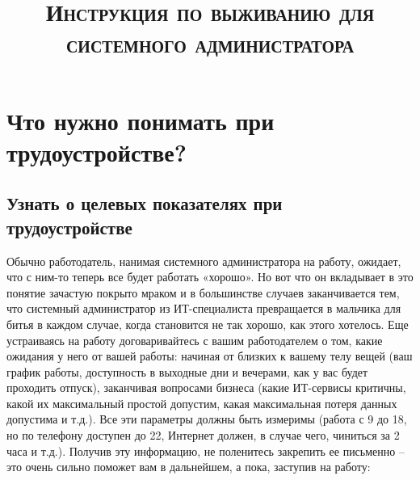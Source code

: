 

\setmainfont{Times New Roman}

\title{\textbf{\textsc{Инструкция по выживанию для системного администратора}}}
\author{}
\date{} %
\linespread{1.3} %

\hypersetup{hidelinks} %


	
	
	\maketitle %
	\thispagestyle{empty} %
	\clearpage %
	\setcounter{page}{1} %
	\thispagestyle{empty}
	\tableofcontents
	\clearpage
	

	\section{Что нужно понимать при трудоустройстве?}
	

	\subsection{Узнать о целевых показателях при трудоустройстве}
	
	Обычно работодатель, нанимая системного администратора на работу, ожидает, что с ним-то теперь все будет работать «хорошо». Но вот что он вкладывает в это понятие зачастую покрыто мраком и в большинстве случаев заканчивается тем, что системный администратор из ИТ-специалиста превращается в мальчика для битья в каждом случае, когда становится не так хорошо, как этого хотелось.
	Еще устраиваясь на работу договаривайтесь с вашим работодателем о том, какие ожидания у него от вашей работы: начиная от близких к вашему телу вещей (ваш график работы, доступность в выходные дни и вечерами, как у вас будет проходить отпуск), заканчивая вопросами бизнеса (какие ИТ-сервисы критичны, какой их максимальный простой допустим, какая максимальная потеря данных допустима и т.д.). Все эти параметры должны быть измеримы (работа с 9 до 18, но по телефону доступен до 22, Интернет должен, в случае чего, чиниться за 2 часа и т.д.). Получив эту информацию, не поленитесь закрепить ее письменно – это очень сильно поможет вам в дальнейшем, а пока, заступив на работу:
	
